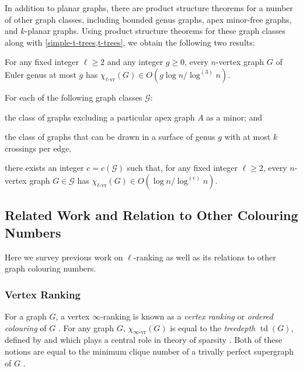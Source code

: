 \documentclass[kpfonts]{patmorin}
\DeclareMathOperator{\td}{td}
\newcommand{\rn}[1]{\chi_{\operatorname{#1-vr}}}
\newcommand{\irn}{\rn{\infty}}
\newcommand{\lrn}{\rn{\ell}}
\theoremstyle{named}
\begin{document}
In addition to planar graphs, there are product structure theorems for a number of other graph classes, including bounded genus graphs, apex minor-free graphs, and $k$-planar graphs.  Using product structure theorems for these graph classes along with \cref{simple-t-trees,t-trees}, we obtain the following two results:

\begin{thm}\label{bounded-genus}
    For any fixed integer $\ell\ge 2$ and any integer $g\ge 0$, every $n$-vertex graph $G$ of Euler genus at most $g$ has $\lrn(G)\in O(g\log n/\log^{(3)} n)$.
\end{thm}

\begin{thm}\label{meta-theorem}\label{meta}
    For each of the following graph classes $\mathcal{G}$:
    \begin{compactenum}
        \item the class of graphs excluding a particular apex graph $A$ as a minor; and
        \item the class of graphs that can be drawn in a surface of genus $g$ with at most $k$ crossings per edge,
    \end{compactenum}
    there exists an integer $c=c(\mathcal{G})$ such that, for any fixed integer $\ell\ge 2$, every $n$-vertex graph $G\in\mathcal{G}$ has $\lrn(G)\in O(\log n/\log^{(c)} n)$.
\end{thm}



\subsection{Related Work and Relation to Other Colouring Numbers}

Here we survey previous work on $\ell$-ranking as well as its relations to other graph colouring numbers.

\subsubsection{Vertex Ranking}

For a graph $G$, a vertex $\infty$-ranking is known as a \emph{vertex ranking} \cite{bodlaender.deogun.ea:rankings} or \emph{ordered colouring} of $G$ \cite{katchalski.mccuaig.ea:ordered}.  For any graph $G$, $\irn(G)$ is equal to the \emph{treedepth} $\td(G)$, defined by \citet{nesetril.ossona:tree-depth} and which plays a central role in theory of sparsity \cite{nesetril.ossona:on,nesetril.ossona:sparsity}.  Both of these notions are equal to the minimum clique number of a trivally perfect supergraph of $G$ \cite{nesetril.ossona:tree-depth}.
\end{document}
